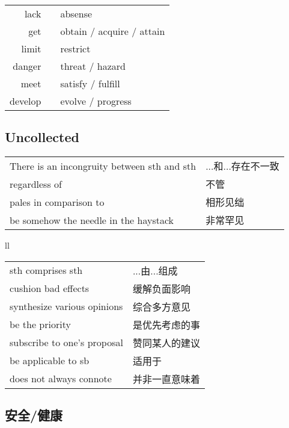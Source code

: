 \begin{tabular}{rc@{\quad$\to$\quad}l}
    lack     &  & absense                                                          \\
    get      &  & obtain / acquire / attain                                        \\
    limit    &  & restrict                                                         \\
    danger   &  & threat / hazard                                                  \\
    meet     &  & satisfy / fulfill                                                \\
    develop  &  & evolve / progress                                                \\
\end{tabular}

\subsection{Uncollected}

\begin{tabular}{ll}
    There is an incongruity between sth and sth & ...和...存在不一致 \\
    regardless of                               & 不管           \\
    pales in comparison to                      & 相形见绌         \\
    be somehow the needle in the haystack       & 非常罕见         \\
\end{tabular}{ll}

\begin{tabular}{ll}
    sth comprises sth           & ...由...组成 \\
    cushion bad effects         & 缓解负面影响    \\
    synthesize various opinions & 综合多方意见    \\
    be the priority             & 是优先考虑的事   \\
    subscribe to one's proposal & 赞同某人的建议   \\
    be applicable to sb         & 适用于       \\
    does not always connote     & 并非一直意味着   \\
\end{tabular}

\subsection{安全/健康}

